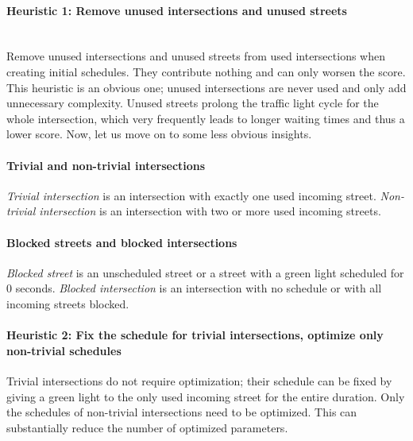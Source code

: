 \paragraph{Heuristic 1: Remove unused intersections and unused streets} \label{para:heuristic_1} \mbox{} \\
Remove unused intersections and unused streets from used intersections when creating initial schedules. They contribute nothing and can only worsen the score. \\

This heuristic is an obvious one; unused intersections are never used and only add unnecessary complexity. Unused streets prolong the traffic light cycle for the whole intersection, which very frequently leads to longer waiting times and thus a lower score. Now, let us move on to some less obvious insights.

\paragraph{Trivial and non-trivial intersections} \textit{Trivial intersection} is an intersection with exactly one used incoming street. \textit{Non-trivial intersection} is an intersection with two or more used incoming streets.

\paragraph{Blocked streets and blocked intersections} \textit{Blocked street} is an unscheduled street or a street with a green light scheduled for 0 seconds. \textit{Blocked intersection} is an intersection with no schedule or with all incoming streets blocked.

\paragraph{Heuristic 2: Fix the schedule for trivial intersections, optimize only non-trivial schedules} \label{para:heuristic_2}
Trivial intersections do not require optimization; their schedule can be fixed by giving a green light to the only used incoming street for the entire duration. Only the schedules of non-trivial intersections need to be optimized. This can substantially reduce the number of optimized parameters. \\

